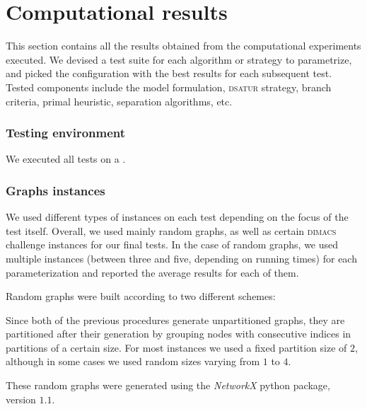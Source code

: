 
\section{Computational results}
\label{sec:results}

This section contains all the results obtained from the computational experiments executed. We devised a test suite for each algorithm or strategy to parametrize, and picked the configuration with the best results for each subsequent test. Tested components include the model formulation, \textsc{dsatur} strategy, branch criteria, primal heuristic, separation algorithms, etc.

\subsubsection*{Testing environment}

We executed all tests on a .

\subsubsection*{Graphs instances}

We used different types of instances on each test depending on the focus of the test itself. Overall, we used mainly random graphs, as well as certain \textsc{dimacs} challenge instances\cite{dimacs} for our final tests. In the case of random graphs, we used multiple instances (between three and five, depending on running times) for each parameterization and reported the average results for each of them.  

Random graphs were built according to two different schemes:
\begin{itemize}
\end{itemize}


Since both of the previous procedures generate unpartitioned graphs, they are partitioned after their generation by grouping nodes with consecutive indices in partitions of a certain size. For most instances we used a fixed partition size of $2$, although in some cases we used random sizes varying from $1$ to $4$.

These random graphs were generated using the \textit{NetworkX} python package\cite{networkx}, version $1.1$.